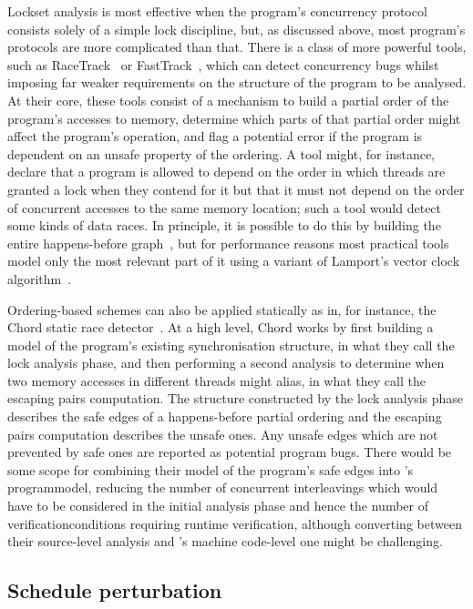 Lockset analysis is most effective when the program's concurrency
protocol consists solely of a simple lock discipline, but, as
discussed above, most program's protocols are more complicated than
that.  There is a class of more powerful tools, such as
RaceTrack~\cite{Yu2005} or FastTrack~\cite{Flanagan2009}, which can
detect concurrency bugs whilst imposing far weaker requirements on the
structure of the program to be analysed.  At their core, these tools
consist of a mechanism to build a partial order of the program's
accesses to memory, determine which parts of that partial order might
affect the program's operation, and flag a potential error if the
program is dependent on an unsafe property of the ordering.  A tool
might, for instance, declare that a program is allowed to depend on
the order in which threads are granted a lock when they contend for it
but that it must not depend on the order of concurrent accesses to the
same memory location; such a tool would detect some kinds of data
races.  In principle, it is possible to do this by building the entire
happens-before graph~\cite{Netzer1991}, but for performance reasons
most practical tools model only the most relevant part of it using a
variant of Lamport's vector clock algorithm~\cite{Lamport1978}.

Ordering-based schemes can also be applied statically as in, for
instance, the Chord static race detector~\cite{Naik2006}.  At a high
level, Chord works by first building a model of the program's existing
synchronisation structure, in what they call the lock analysis phase,
and then performing a second analysis to determine when two memory
accesses in different threads might alias, in what they call the
escaping pairs computation.  The structure constructed by the lock
analysis phase describes the safe edges of a happens-before partial
ordering and the escaping pairs computation describes the unsafe ones.
Any unsafe edges which are not prevented by safe ones are reported as
potential program bugs.  There would be some scope for combining their
model of the program's safe edges into {\technique}'s
\gls{programmodel}, reducing the number of concurrent interleavings
which would have to be considered in the initial analysis phase and
hence the number of \glspl{verificationcondition} requiring runtime
verification, although converting between their source-level analysis
and {\technique}'s machine code-level one might be challenging.

\subsection{Schedule perturbation}

